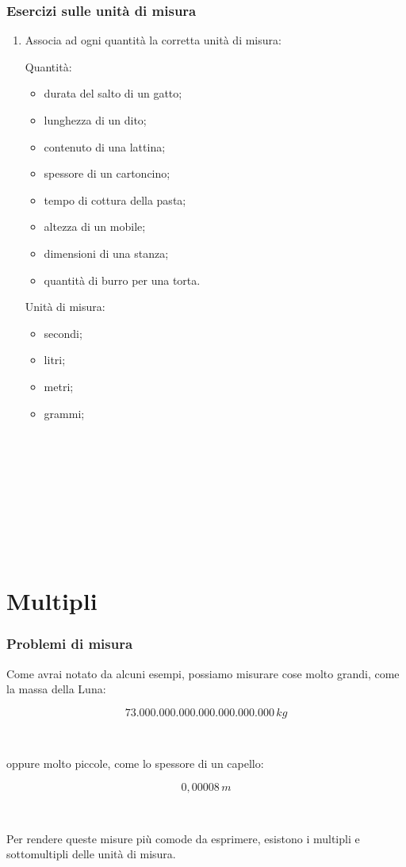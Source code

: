\documentclass[handout]{beamer}
\theoremstyle{plain}
\begin{document}
\begin{frame}
\frametitle{Esercizi sulle unità di misura}
\begin{enumerate}
  \item Associa ad ogni quantità la corretta unità di misura:
  \begin{multicols}{2}
    Quantità:
    \begin{itemize}
        \item durata del salto di un gatto;
        \item lunghezza di un dito;
        \item contenuto di una lattina;
        \item spessore di un cartoncino;
        \item tempo di cottura della pasta;
        \item altezza di un mobile;
        \item dimensioni di una stanza;
        \item quantità di burro per una torta.
    \end{itemize}
    Unità di misura:
    \begin{itemize}
      \item secondi;
      \item litri;
      \item metri;
      \item grammi;
    \end{itemize}

    ~

    ~

    ~

    ~

    ~

  \end{multicols}
\end{enumerate}
\end{frame}




\section{Multipli}

\begin{frame}
\frametitle{Problemi di misura}
Come avrai notato da alcuni esempi, possiamo misurare cose \alert{molto grandi}, come la massa della Luna:

\[ 73.000.000.000.000.000.000.000 \, kg \]

~

oppure \alert{molto piccole}, come lo spessore di un capello:

\[ 0,00008 \, m \]\pause

~

Per rendere queste misure più comode da esprimere, esistono i \alert{multipli e sottomultipli delle unità di misura}.
\end{frame}
\end{document}
